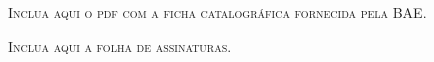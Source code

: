 


\usepackage{graphicx}
\usepackage{subcaption}
\usepackage{amsmath}
\usepackage{amssymb}
\usepackage{float}
\usepackage{makecell}
\usepackage[brazil]{babel}
\usepackage[T1]{fontenc}
\usepackage{hyperref}
\usepackage{tabularx}
\usepackage{multirow}
\usepackage{bookmark} %
\usepackage{placeins} %


\makeindex


\frenchspacing



\imprimircapa


\imprimirfolhaderosto


\pagestyle{plain}
\setcounter{page}{1}

 \begin{fichacatalografica}
    \vspace*{\fill}
    \begin{center}
        \textsc{Inclua aqui o pdf com a ficha catalogr\'{a}fica fornecida pela BAE.}
    \end{center}
    \vspace*{\fill}
 \end{fichacatalografica}


%


\newpage
\vspace*{\fill}
\begin{center}
    \textsc{Inclua aqui a folha de assinaturas.}
\end{center}
\vspace*{\fill}
\newpage
%	
\cleardoublepage

